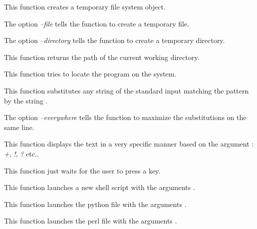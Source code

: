          {
	   This function creates a temporary file system object.

	   The option \textit{--file} tells the function to create a
	   temporary file.

	   The option \textit{--directory} tells the function to create
	   a temporary directory.
	 }

         {
	   This function returns the path of the current working directory.
	 }

         {
	   This function tries to locate the program 
	   on the system.
	 }

         {
	   This function substitutes any string of the standard input
	   matching the pattern  by the string
	   .

	   The option \textit{--everywhere} tells the function to
	   maximize the substitutions on the same line.
	 }

         {
	   This function displays the text  in a
	   very specific manner based on the argument :
	   \textit{+}, \textit{!}, \textit{?} etc..
	 }

         {
	   This function just waits for the user to press a key.
	 }

         {
	   This function launches a new shell script  with
	   the arguments .
	 }

         {
	   This function launches the python file  with
	   the arguments .
	 }

         {
	   This function launches the perl file  with
	   the arguments .
	 }

